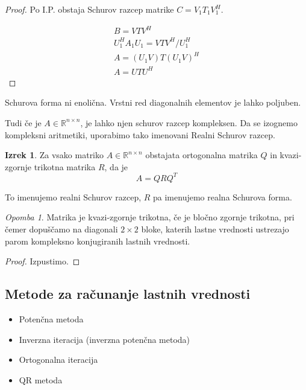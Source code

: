 \documentclass[a4paper,12pt]{article}
\theoremstyle{definition}
\newtheorem{theorem}[counter]{Izrek}
\theoremstyle{remark}
\newtheorem*{rem}{Opomba}
\newcommand{\R}{\mathbb{R}}
\begin{document}
\begin{proof}
    Po I.P. obstaja Schurov razcep matrike $C = V_1 T_1 V_1^H$.

    \begin{gather*}
        B = V T V^H \\
        U_1^H A_1 U_1 = V T V^H /U_1^H \\
        A = (U_1 V) T (U_1 V)^H \\
        A = U T U^H
    \end{gather*}
\end{proof}

Schurova forma ni enolična. Vrstni red diagonalnih elementov je lahko poljuben.

Tudi če je $A \in \R^{n\times n}$, je lahko njen schurov razcep kompleksen. Da se izognemo kompleksni aritmetiki, uporabimo tako imenovani Realni Schurov razcep.

\begin{theorem}
    Za vsako matriko $A \in \R^{n\times n}$ obstajata ortogonalna matrika $Q$ in kvazi-zgornje trikotna matrika $R$, da je
    \begin{equation*}
        A = QRQ^T
    \end{equation*}

    To imenujemo realni Schurov razcep, $R$ pa imenujemo realna Schurova forma.
\end{theorem}

\begin{rem}
    Matrika je kvazi-zgornje trikotna, če je bločno zgornje trikotna, pri čemer dopuščamo na diagonali $2 \times 2$ bloke, katerih lastne vrednosti
    ustrezajo parom kompleksno konjugiranih lastnih vrednosti.
\end{rem}

\begin{proof}
    Izpustimo.
\end{proof}

\subsection{Metode za računanje lastnih vrednosti}
\begin{itemize}
    \item Potenčna metoda
    \item Inverzna iteracija (inverzna potenčna metoda)
    \item Ortogonalna iteracija
    \item QR metoda
\end{itemize}
\end{document}
